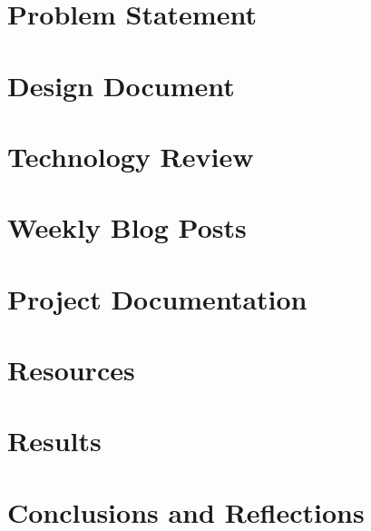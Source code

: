 \documentclass[onecolumn, draftclsnofoot,10pt, compsoc]{IEEEtran}
\begin{document}
\section{Problem Statement}
	
\section{Design Document}
	
\section{Technology Review} 
	
    
    
\section{Weekly Blog Posts}
	

\section{Project Documentation}
	
\section{Resources}
	
\section{Results}
	
	
\section{Conclusions and Reflections}
	


\end{document}
